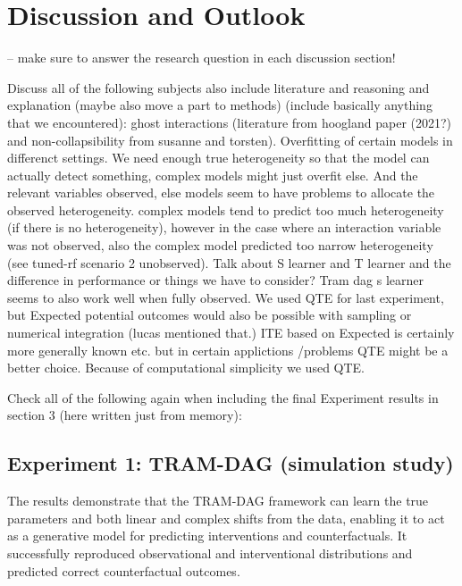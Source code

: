 

\chapter{Discussion and Outlook}

-- make sure to answer the research question in each discussion section!


Discuss all of the following subjects also include literature and reasoning and explanation (maybe also move a part to methods) (include basically anything that we encountered): ghost interactions (literature from hoogland paper (2021?) and non-collapsibility from susanne and torsten). Overfitting of certain models in differenct settings. We need enough true heterogeneity so that the model can actually detect something, complex models might just overfit else. And the relevant variables observed, else models seem to have problems to allocate the observed heterogeneity. complex models tend to predict too much heterogeneity (if there is no heterogeneity), however in the case where an interaction variable was not observed, also the complex model predicted too narrow heterogeneity (see tuned-rf scenario 2 unobserved). Talk about S learner and T learner and the difference in performance or things we have to consider? Tram dag s learner seems to also work well when fully observed. We used QTE for last experiment, but Expected potential outcomes would also be possible with sampling or numerical integration (lucas mentioned that.) ITE based on Expected is certainly more generally known etc. but in certain applictions /problems QTE might be a better choice. Because of computational simplicity we used QTE.



Check all of the following again when including the final Experiment results in section 3 (here written just from memory):


\section{Experiment 1: TRAM-DAG (simulation study)}

The results demonstrate that the TRAM-DAG framework can learn the true parameters and both linear and complex shifts from the data, enabling it to act as a generative model for predicting interventions and counterfactuals. It successfully reproduced observational and interventional distributions and predicted correct counterfactual outcomes.

